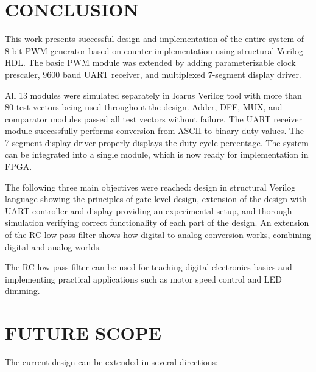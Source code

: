 \documentclass[12pt,a4paper]{article}
\begin{document}
\section{CONCLUSION}

This work presents successful design and implementation of the entire system of 8-bit PWM generator based on counter implementation using structural Verilog HDL. The basic PWM module was extended by adding parameterizable clock prescaler, 9600 baud UART receiver, and multiplexed 7-segment display driver.

All 13 modules were simulated separately in Icarus Verilog tool with more than 80 test vectors being used throughout the design. Adder, DFF, MUX, and comparator modules passed all test vectors without failure. The UART receiver module successfully performs conversion from ASCII to binary duty values. The 7-segment display driver properly displays the duty cycle percentage. The system can be integrated into a single module, which is now ready for implementation in FPGA.

The following three main objectives were reached: design in structural Verilog language showing the principles of gate-level design, extension of the design with UART controller and display providing an experimental setup, and thorough simulation verifying correct functionality of each part of the design. An extension of the RC low-pass filter shows how digital-to-analog conversion works, combining digital and analog worlds.

The RC low-pass filter can be used for teaching digital electronics basics and implementing practical applications such as motor speed control and LED dimming.

\section{FUTURE SCOPE}

The current design can be extended in several directions:
\end{document}
